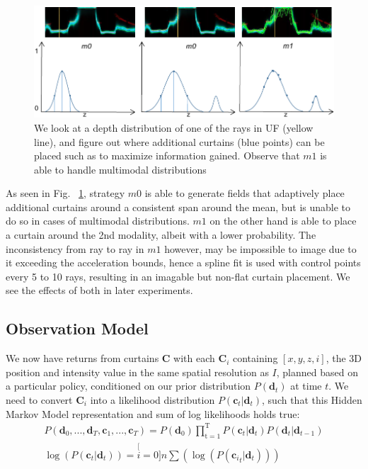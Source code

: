 \begin{figure}[h]
   \centering
   \begin{minipage}{0.5\textwidth}
       \centering
       \includegraphics[width=1.0\textwidth]{figures/fields.pdf}
   \end{minipage}\hfill
   \centering
   \caption{We look at a depth distribution of one of the rays in UF (yellow line), and figure out where additional curtains (blue points) can be placed such as to maximize information gained. Observe that $m1$ is able to handle multimodal distributions}
   \label{fig:m0m1}
\end{figure}

As seen in Fig. ~\ref{fig:m0m1}, strategy $m0$ is able to generate fields that adaptively place additional curtains around a consistent span around the mean, but is unable to do so in cases of multimodal distributions. $m1$ on the other hand is able to place a curtain around the 2nd modality, albeit with a lower probability. The inconsistency from ray to ray in $m1$ however, may be impossible to image due to it exceeding the acceleration bounds, hence a spline fit is used with control points every 5 to 10 rays, resulting in an imagable but non-flat curtain placement. We see the effects of both in later experiments.

\subsection{Observation Model}

We now have returns from curtains $\mathbf{C}$ with each $\mathbf{C}_{i}$ containing $[x,y,z,i]$, the 3D position and intensity value in the same spatial resolution as $I$, planned based on a particular policy, conditioned on our prior distribution $P(\mathbf{d}_{t})$ at time $t$. We need to convert $\mathbf{C}_{i}$ into a likelihood distribution $P(\mathbf{c}_{t}|\mathbf{d}_{t})$, such that this Hidden Markov Model representation and sum of log likelihoods holds true:
\small
\begin{align}
   P\left(\mathbf{d}_{0},...,\mathbf{d}_{T},\mathbf{c}_{1},...,\mathbf{c}_{T}\right)= 
   P\left(\mathbf{d}_{0}\right)\mathbf{\mathbf{\prod}_{\mathrm{t=1}}^{\mathrm{T}}}P\left(\mathbf{c}_{t}|\mathbf{d}_{t}\right)P\left(\mathbf{d}_{t}|\mathbf{d}_{t-1}\right) \nonumber\\
   \log\left(P\left(\mathbf{c}_{t}|\mathbf{d}_{t}\right)\right)=\stackrel[i=0]{n}{\sum}\left(\log\left(P\left(\mathbf{c_{\mathit{i}}}_{t}|\mathbf{d}_{t}\right)\right)\right)
   \label{eq:hmm}
\end{align}
\normalsize

